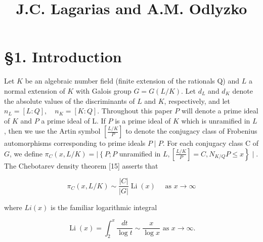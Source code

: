 \title{
J.C. Lagarias and A.M. Odlyzko
}

\section{§1. Introduction}

Let $K$ be an algebraic number field (finite extension of the rationals Q) and $L$ a normal extension of $K$ with Galois group $G=G(L / K)$. Let $d_{L}$ and $d_{K}$ denote the absolute values of the discriminants of $L$ and $K$, respectively, and let $n_{L}=[L: Q], \quad n_{K}=[K: Q]$. Throughout this paper $P$ will denote a prime ideal of $K$ and $P$ a prime ideal of L. If $P$ is a prime ideal of $K$ which is unramified in $L$, then we use the Artin symbol $\left[\frac{L / K}{P}\right]$ to denote the conjugacy class of Frobenius automorphisms corresponding to prime ideals $P \mid P$. For each conjugacy class C of $G$, we define $\pi_{C}(x, L / K)=\mid\left\{P ; P\right.$ unramified in $\left.L,\left[\frac{L / K}{P}\right]=C, N_{K / Q} P \leqslant x\right\} \mid$. The Chebotarev density theorem [15] asserts that

$$
\pi_{C}(x, L / K) \sim \frac{|C|}{|G|} \operatorname{Li}(x) \quad \text { as } x \rightarrow \infty
$$

where $L i(x)$ is the familiar logarithmic integral 

$$
\operatorname{Li}(x)=\int_{2}^{x} \frac{d t}{\log t} \sim \frac{x}{\log x} \text { as } x \rightarrow \infty .
$$

